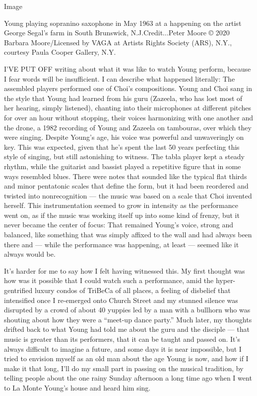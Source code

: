 Image

Young playing sopranino saxophone in May 1963 at a happening on the
artist George Segal's farm in South Brunswick, N.J.Credit...Peter Moore
© 2020 Barbara Moore/Licensed by VAGA at Artists Rights Society (ARS),
N.Y., courtesy Paula Cooper Gallery, N.Y.

I'VE PUT OFF writing about what it was like to watch Young perform,
because I fear words will be insufficient. I can describe what happened
literally: The assembled players performed one of Choi's compositions.
Young and Choi sang in the style that Young had learned from his guru
(Zazeela, who has lost most of her hearing, simply listened), chanting
into their microphones at different pitches for over an hour without
stopping, their voices harmonizing with one another and the drone, a
1982 recording of Young and Zazeela on tambouras, over which they were
singing. Despite Young's age, his voice was powerful and unwaveringly on
key. This was expected, given that he's spent the last 50 years
perfecting this style of singing, but still astonishing to witness. The
tabla player kept a steady rhythm, while the guitarist and bassist
played a repetitive figure that in some ways resembled blues. There were
notes that sounded like the typical flat thirds and minor pentatonic
scales that define the form, but it had been reordered and twisted into
nonrecognition --- the music was based on a scale that Choi invented
herself. This instrumentation seemed to grow in intensity as the
performance went on, as if the music was working itself up into some
kind of frenzy, but it never became the center of focus: That remained
Young's voice, strong and balanced, like something that was simply
affixed to the wall and had always been there and --- while the
performance was happening, at least --- seemed like it always would be.

It's harder for me to say how I felt having witnessed this. My first
thought was how was it possible that I could watch such a performance,
amid the hyper-gentrified luxury condos of TriBeCa of all places, a
feeling of disbelief that intensified once I re-emerged onto Church
Street and my stunned silence was disrupted by a crowd of about 40
yuppies led by a man with a bullhorn who was shouting about how they
were a ``meet-up dance party.'' Much later, my thoughts drifted back to
what Young had told me about the guru and the disciple --- that music is
greater than its performers, that it can be taught and passed on. It's
always difficult to imagine a future, and some days it is near
impossible, but I tried to envision myself as an old man about the age
Young is now, and how if I make it that long, I'll do my small part in
passing on the musical tradition, by telling people about the one rainy
Sunday afternoon a long time ago when I went to La Monte Young's house
and heard him sing.

